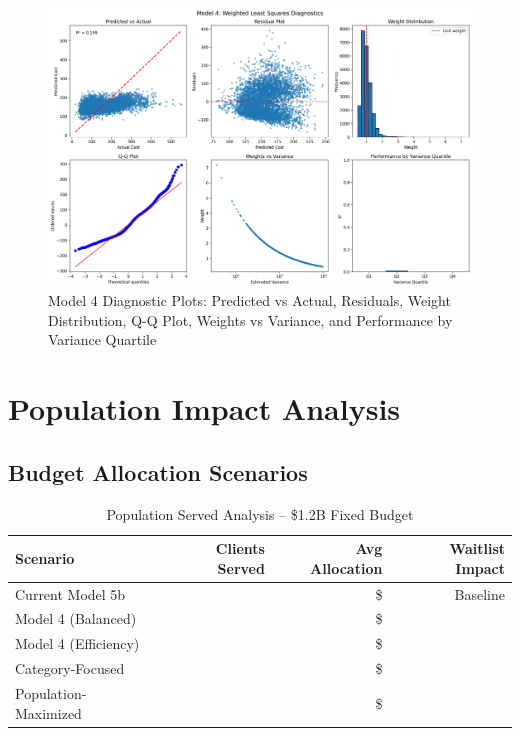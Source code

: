 \begin{figure}[h]
    \centering
    \includegraphics[width=\textwidth]{models/model_4/diagnostic_plots.png}
    \caption{Model 4 Diagnostic Plots: Predicted vs Actual, Residuals, Weight Distribution, Q-Q Plot, Weights vs Variance, and Performance by Variance Quartile}
    \label{fig:model4_diagnostics}
\end{figure}

\section{Population Impact Analysis}

\subsection{Budget Allocation Scenarios}

\begin{table}[h]
\centering
\caption{Population Served Analysis -- \$1.2B Fixed Budget}
\begin{tabular}{lrrr}
\toprule
\textbf{Scenario} & \textbf{Clients Served} & \textbf{Avg Allocation} & \textbf{Waitlist Impact} \\
\midrule
Current Model 5b & \ModelFourPopcurrentbaselineClients{} & \$\ModelFourPopcurrentbaselineAvgAlloc{} & Baseline \\
Model 4 (Balanced) & \ModelFourPopmodelbalancedClients{} & \$\ModelFourPopmodelbalancedAvgAlloc{} & \ModelFourPopmodelbalancedWaitlistChange{} \\
Model 4 (Efficiency) & \ModelFourPopmodelefficiencyClients{} & \$\ModelFourPopmodelefficiencyAvgAlloc{} & \ModelFourPopmodelefficiencyWaitlistChange{} \\
Category-Focused & \ModelFourPopcategoryfocusedClients{} & \$\ModelFourPopcategoryfocusedAvgAlloc{} & \ModelFourPopcategoryfocusedWaitlistChange{} \\
Population-Maximized & \ModelFourPoppopulationmaximizedClients{} & \$\ModelFourPoppopulationmaximizedAvgAlloc{} & \ModelFourPoppopulationmaximizedWaitlistChange{} \\
\bottomrule
\end{tabular}
\end{table}

